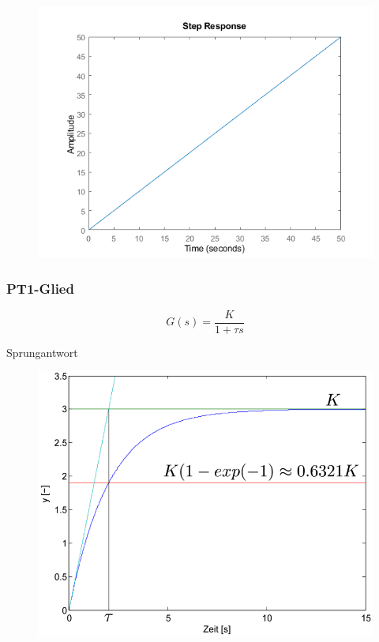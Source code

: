\documentclass[
  10pt,
  a4paper,
]{article}
\numberwithin{equation}{section}
\begin{document}
\begin{multicols}{2}
\begin{figure}[H]
{\centering \includegraphics{images/paste-22.png}

}

\end{figure}

\hypertarget{pt1-glied}{%
\subsubsection{PT1-Glied}\label{pt1-glied}}

\[
G(s)=\frac{K}{1+\tau s}
\]

Sprungantwort

\begin{figure}[H]

{\centering \includegraphics{images/paste-20.png}

}
\end{figure}
\end{multicols}
\end{document}
